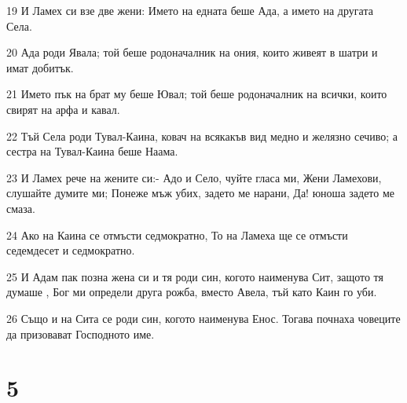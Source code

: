 \par 19 И Ламех си взе две жени: Името на едната беше Ада, а името на другата Села.
\par 20 Ада роди Явала; той беше родоначалник на ония, които живеят в шатри и имат добитък.
\par 21 Името пък на брат му беше Ювал; той беше родоначалник на всички, които свирят на арфа и кавал.
\par 22 Тъй Села роди Тувал-Каина, ковач на всякакъв вид медно и желязно сечиво; а сестра на Тувал-Каина беше Наама.
\par 23 И Ламех рече на жените си:- Адо и Село, чуйте гласа ми, Жени Ламехови, слушайте думите ми; Понеже мъж убих, задето ме нарани, Да! юноша задето ме смаза.
\par 24 Ако на Каина се отмъсти седмократно, То на Ламеха ще се отмъсти седемдесет и седмократно.
\par 25 И Адам пак позна жена си и тя роди син, когото наименува Сит, защото тя думаше , Бог ми определи друга рожба, вместо Авела, тъй като Каин го уби.
\par 26 Също и на Сита се роди син, когото наименува Енос. Тогава почнаха човеците да призовават Господното име.

\chapter{5}

